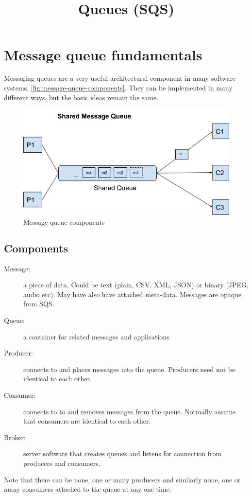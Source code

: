 \documentclass{pgnotes}
\title{Queues (SQS)}
\begin{document}
\maketitle

\section{Message queue fundamentals}

Messaging queues are a very useful architectural component in many software systems, \autoref{fig:message-queue-components}.
They can be implemented in many different ways, but the basic ideas remain the same.

\begin{figure}[htbp]
  \centering
  \includegraphics[width=0.75\linewidth]{shared_message_queue}
  \caption{Message queue components}
  \label{fig:message-queue-components}
\end{figure}

\subsection{Components}

\begin{description}
\item[Message:] a piece of data.  Could be text (plain, CSV, XML, JSON) or binary (JPEG, audio etc). May have also have attached meta-data. Messages are opaque from SQS.
\item[Queue:] a container for related messages and applications
\item[Producer:] connects to and places messages into the queue. Producers need not be identical to each other.
\item[Consumer:] connects to to and removes messages from the queue. Normally assume that consumers are identical to each other.
\item[Broker:] server software that creates queues and listens for connection from producers and consumers.
\end{description}
Note that there can be none, one or many producers and similarly none, one or many consumers attached to the queue at any one time. 
\end{document}

